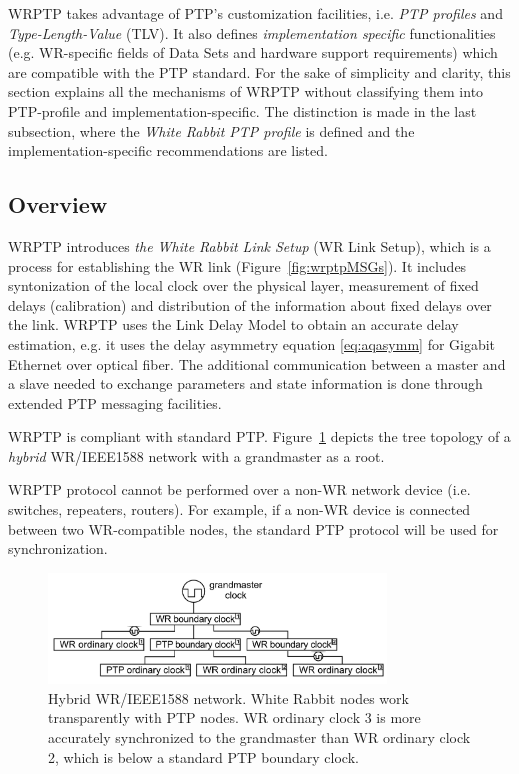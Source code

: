 \documentclass[a4paper, 12pt]{article}
\begin{document}
WRPTP takes advantage of PTP's customization facilities, i.e. \textit{PTP profiles} and 
\textit{Type-Length-Value} (TLV).
It also defines \textit{implementation specific} functionalities (e.g. WR-specific fields of 
Data Sets and hardware support requirements) which are compatible with the PTP standard. 
For the sake of simplicity and clarity, this section explains all the mechanisms of WRPTP without 
classifying them into PTP-profile
and implementation-specific. The distinction is 
made in the last subsection, where the \textit{White Rabbit PTP profile} is defined and 
the implementation-specific recommendations are listed.

\subsection{Overview}
\label{sec:wrptpOverview}


WRPTP introduces \textit{the White Rabbit Link Setup} (WR Link Setup), which is a process for 
establishing the WR link  (Figure~\ref{fig:wrptpMSGs}). It includes syntonization of the local clock
 over the physical layer, measurement of fixed delays (calibration)  and distribution of the 
information about fixed delays over the link. WRPTP uses the Link Delay 
Model to obtain an accurate delay estimation, e.g. it uses the delay asymmetry equation 
\eqref{eq:aqasymm}  for Gigabit Ethernet over optical fiber. The additional communication between 
a master and a slave needed to exchange parameters and state information is done through extended 
PTP messaging facilities. 

WRPTP is compliant with standard PTP. Figure~\ref{fig:hybrid-network} depicts the tree topology 
of a \emph{hybrid} WR/IEEE1588 network with a grandmaster as a root. 

WRPTP protocol cannot be performed over a non-WR network device (i.e. switches, repeaters, routers). 
For example, if a non-WR device is connected between two WR-compatible nodes, 
the standard PTP protocol will be used for synchronization. 


\begin{figure}[ht!]
  \centering
  \includegraphics[width=0.8\textwidth]{network/hybrid.pdf}
  \caption{Hybrid WR/IEEE1588 network. White Rabbit nodes work
    transparently with PTP nodes. WR ordinary clock 3 is more accurately
      synchronized to the grandmaster than WR ordinary clock 2, which
      is below a standard PTP boundary clock.}
  \label{fig:hybrid-network}
\end{figure}
\end{document}
